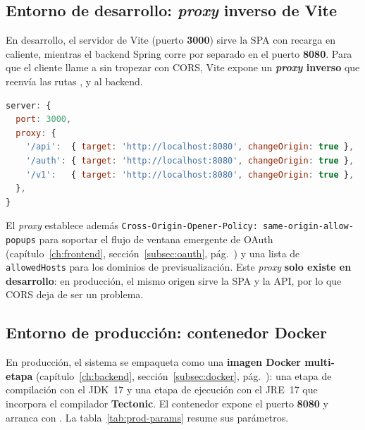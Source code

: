 \subsection{Entorno de desarrollo: \textit{proxy} inverso de Vite}
\label{subsec:entorno_dev}

En desarrollo, el servidor de Vite (puerto \textbf{3000}) sirve la SPA con recarga en
caliente, mientras el backend Spring corre por separado en el puerto \textbf{8080}. Para
que el cliente llame a  sin tropezar con CORS, Vite expone un
\textbf{\textit{proxy} inverso} que reenvía las rutas ,  y
 al backend.

\begin{lstlisting}[language=JavaScript, caption={Proxy inverso de desarrollo (\texttt{vite.config.ts}).}, label={lst:vite-proxy}]
server: {
  port: 3000,
  proxy: {
    '/api':  { target: 'http://localhost:8080', changeOrigin: true },
    '/auth': { target: 'http://localhost:8080', changeOrigin: true },
    '/v1':   { target: 'http://localhost:8080', changeOrigin: true },
  },
}
\end{lstlisting}

\begin{NotaTecnica}
El \textit{proxy} establece además \texttt{Cross-Origin-Opener-Policy:
same-origin-allow-popups} para soportar el flujo de ventana emergente de OAuth
(capítulo~\ref{ch:frontend}, sección~\ref{subsec:oauth}, pág.~\pageref{subsec:oauth}) y una
lista de \texttt{allowedHosts} para los dominios de previsualización. Este \textit{proxy}
\textbf{solo existe en desarrollo}: en producción, el mismo origen sirve la SPA y la API,
por lo que CORS deja de ser un problema.
\end{NotaTecnica}

\subsection{Entorno de producción: contenedor Docker}
\label{subsec:entorno_prod}

En producción, el sistema se empaqueta como una \textbf{imagen Docker multi-etapa}
(capítulo~\ref{ch:backend}, sección~\ref{subsec:docker}, pág.~\pageref{subsec:docker}): una
etapa de compilación con el JDK~17 y una etapa de ejecución con el JRE~17 que incorpora el
compilador \textbf{Tectonic}. El contenedor expone el puerto \textbf{8080} y arranca con
. La tabla~\ref{tab:prod-params} resume sus parámetros.

